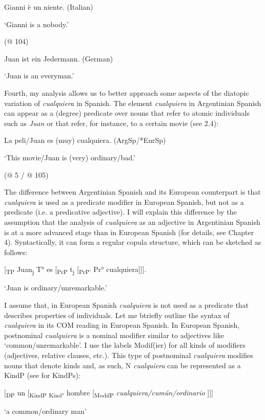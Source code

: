   Gianni è un niente.   (Italian)

  ‘Gianni is a nobody.’

  (@ 104)

  Juan ist ein Jedermann.   (German)

  ‘Juan is an everyman.’

Fourth, my analysis allows us to better approach some aspects of the diatopic variation of \textit{cualquiera} in Spanish. The element \textit{cualquiera} in Argentinian Spanish can appear as a (degree) predicate over nouns that refer to atomic individuals such as \textit{Juan} or that refer, for instance, to a certain movie (see 2.4):

  La peli/Juan es (muy) cualquiera.   (ArgSp/*EurSp)

  ‘This movie/Juan is (very) ordinary/bad.’

  (@ 5 / @ 105)

The difference between Argentinian Spanish and its European counterpart is that \textit{cualquiera} is used as a predicate modifier in European Spanish, but not as a predicate (i.e. a predicative adjective). I will explain this difference by the assumption that the analysis of \textit{cualquiera} as an adjective in Argentinian Spanish is at a more advanced stage than in European Spanish (for details, see Chapter 4). Syntactically, it can form a regular copula structure, which can be sketched as follows:

  [\textsubscript{TP} Juan\textsubscript{j} T° es [\textsubscript{PrP} t\textsubscript{j} [\textsubscript{PrP'} Pr° cualquiera]]].

  ‘Juan is ordinary/unremarkable.’

I assume that, in European Spanish \textit{cualquiera} is not used as a predicate that describes properties of individuals. Let me btriefly outline the syntax of \textit{cualquiera} in its COM reading in European Spanish. In European Spanish, postnominal \textit{cualquiera} is a nominal modifier similar to adjectives like ‘common/unremarkable’. I use the labels Modif(ier) for all kinds of modifiers (adjectives, relative clauses, etc.). This type of postnominal \textit{cualquiera} modifies nouns that denote kinds and, as such, N \textit{cualquiera} can be represented as a KindP (see \citealt{Zamparelli2000} for KindPs):

  [\textsubscript{DP} un [\textsubscript{KindP} \textsubscript{Kind°} hombre [\textsubscript{ModifP} \textit{cualquiera/cumún/ordinario} ]]]

  ‘a common/ordinary man’

